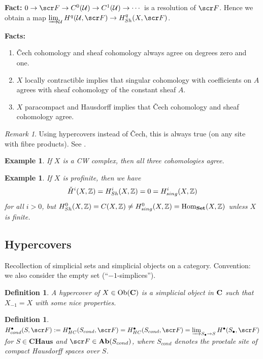 \documentclass[A4paper, british, reqno]{amsart}
\theoremstyle{darkgreentheorem}
\theoremstyle{darkbluedefinition}
\newtheorem{defn}[thm]{Definition}
\theoremstyle{darkredexample}
\newtheorem{exa}[thm]{Example}
\theoremstyle{remark}
\newtheorem{rem}[thm]{Remark}
\DeclareMathOperator{\Hom}{Hom}
\DeclareMathOperator{\Ob}{Ob}
\newcommand{\CHaus}{\mathbf{CHaus}}
\newcommand{\1}{\mathbbm{1}}
\newcommand{\grd}{^{\bullet}}
\begin{document}
\textbf{Fact:} $0\to \F\to C^{0}(\U) \to C^{1}(\U)\to \cdots $ is a resolution of $\F$.
Hence  we obtain a map $\varinjlim_{\U}H^{q}(\U,\F)\to H^{q}_{Sh}(X,\F)$.

\textbf{Facts:}
\begin{enumerate}[label=\arabic*)]
    \item \v{C}ech cohomology and sheaf cohomology always agree on degrees zero and one.
    \item $X$ locally contractible implies that singular cohomology with coefficients on $A$ agrees with sheaf cohomology of the constant sheaf $A$.
    \item $X$ paracompact and Hausdorff implies that \v{C}ech cohomology and sheaf cohomology agree.
\end{enumerate}

\begin{rem}
    Using hypercovers instead of \v{C}ech, this is always true (on any site with fibre products).
    See \cite[\href{https://stacks.math.columbia.edu/tag/01H0}{Tag 01H0}]{sta19}.
\end{rem}

\begin{exa}
    If $X$ is a CW complex, then all three cohomologies agree.
\end{exa}

\begin{exa}
    If $X$ is profinite, then we have
    \[ \check{H}^{i}(X,\mathbb{Z})=H^{i}_{Sh}(X,\mathbb{Z})=0=H^{i}_{sing}(X,\mathbb{Z}) \]
    for all $i>0$, but $H^{0}_{Sh}(X,\Z)=C(X,\Z)\neq H^{0}_{sing}(X,\Z)=\Hom_{\Set}(X,\Z)$ unless $X$ is finite.
\end{exa}

\subsection{Hypercovers}

Recollection of simplicial sets and simplicial objects on a category.
Convention: we also consider the empty set (``$-1$-simplices'').

\begin{defn}
    A \textit{hypercover} of $X\in \Ob(\bfC)$ is a simplicial object in $\mathbf{C}$ such that $X_{-1}=X$ with some nice properties.
\end{defn}

\begin{defn}
    $H_{cond}\grd(S,\F):=H\grd_{HC}(S_{cond},\F)=H\grd_{HC}(S_{cond},\F)=\varinjlim_{S_{\bullet}\to S}H\grd(S_{\bullet},\F)$ for $S\in \CHaus$ and $\F\in \Ab(S_{cond})$, where $S_{cond}$ denotes the proetale site of compact Hausdorff spaces over $S$.
\end{defn}
\end{document}
